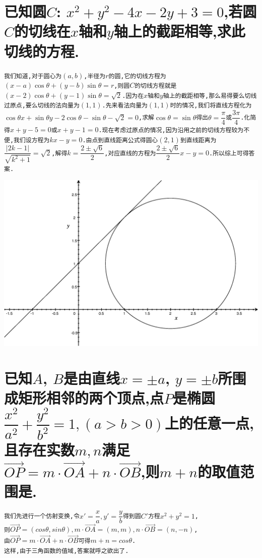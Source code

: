 \documentclass[oneside]{book}
\newcommand{\1}{\underline{\makebox[1cm]{}}}
\newcommand{\2}{\underline{\makebox[2cm]{}}}
\newcommand{\3}{\underline{\makebox[3cm]{}}}
\newcommand{\4}{\underline{\makebox[4cm]{}}}
\newcommand{\lge}{\large \texttt}
\newcommand{\xl}{\overrightarrow}
\newlength{\la}
\begin{document}
        \section{已知圆$C$: $x^2+y^2-4x-2y+3=0$,若圆$C$的切线在$x$轴和$y$轴上的截距相等,求此切线的方程.}
        \begin{minipage}[b]{0.6\linewidth}
            \lge{我们知道,对于圆心为$(a,b)$,半径为$r$的圆,它的切线方程为$(x-a)\cos\theta+(y-b)\sin\theta=r$,则圆$C$的切线方程就是$(x-2)\cos\theta+(y-1)\sin\theta=\sqrt{2}$.因为在$x$轴和$y$轴上的截距相等,那么易得要么切线过原点,要么切线的法向量为$(1,1)$.先来看法向量为$(1,1)$时的情况,我们将直线方程化为$\cos\theta x+\sin\theta y-2\cos\theta-\sin\theta-\sqrt{2}=0$,求解$\cos\theta=\sin\theta$得出$\theta =\dfrac{\pi}{4}$或$\dfrac{3\pi}{4}$.化简得$x+y-5=0$或$x+y-1=0$.现在考虑过原点的情况,因为沿用之前的切线方程较为不便,我们设方程为$kx-y=0$.由点到直线距离公式得圆心$(2,1)$到直线距离为$\dfrac{|2k-1|}{\sqrt{k^2+1}}=\sqrt{2}$,解得$k=\dfrac{2\pm \sqrt{6}}{2}$,对应直线的方程为$\dfrac{2\pm \sqrt{6}}{2}x-y=0$.所以综上可得答案.}
            \end{minipage}
            \hfill
            \begin{minipage}[b]{0.35\linewidth}
            \includegraphics[height=7\baselineskip]{41.eps}
        \end{minipage}

        \section{已知$A$, $B$是由直线$x=\pm a$, $y=\pm b$所围成矩形相邻的两个顶点,点$P$是椭圆$\dfrac{x^2}{a^2}+\dfrac{y^2}{b^2}=1,(a>b>0)$上的任意一点,且存在实数$m,n$满足$\overrightarrow{OP}=m\cdot \overrightarrow{OA}+n\cdot \overrightarrow{OB} $,则$m+n$的取值范围是\3.}
        \lge{我们先进行一个仿射变换,令$x'=\dfrac{x}{a},y'=\dfrac{y}{b}$得到圆$C'$方程$x^2+y^2=1$,\\则$\xl{OP}=(cos\theta,sin\theta),m\cdot\xl{OA}=(m,m),n\cdot\xl{OB}=(n,-n)$,\\由$\overrightarrow{OP}=m\cdot \overrightarrow{OA}+n\cdot \overrightarrow{OB} $可得$m+n=cos\theta$.\\这样,由于三角函数的值域,答案就呼之欲出了.}
\end{document}
